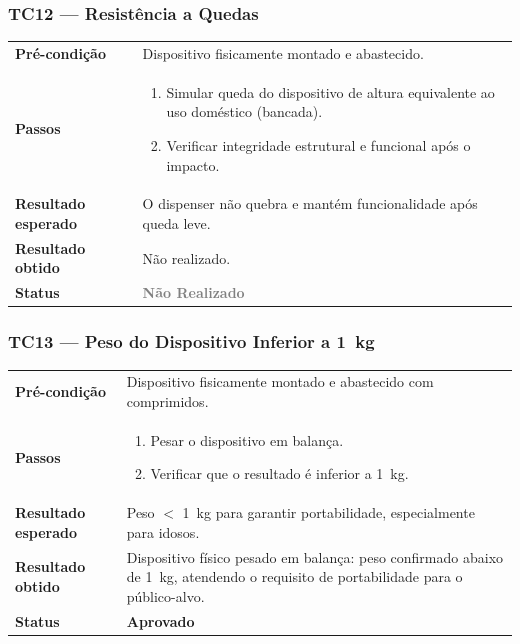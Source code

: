 \documentclass[12pt,a4paper]{article}
\newcommand{\lightrule}{\arrayrulecolor{gray!35}\midrule\arrayrulecolor{black}}
\newcommand{\aprovado}{\textcolor{green!60!black}{\textbf{Aprovado}}}
\newcommand{\naorealizado}{\textcolor{gray}{\textbf{Não Realizado}}}
\begin{document}
\subsubsection{TC12 — Resistência a Quedas}
\begin{table}[H]\small\setlength{\tabcolsep}{6pt}\renewcommand{\arraystretch}{1.3}
\begin{tabularx}{\textwidth}{>{\bfseries}p{4cm} X}
\toprule
Pré-condição & Dispositivo fisicamente montado e abastecido. \\
\lightrule
Passos &
\begin{enumerate}[nosep,leftmargin=*]
  \item Simular queda do dispositivo de altura equivalente ao uso doméstico (bancada).
  \item Verificar integridade estrutural e funcional após o impacto.
\end{enumerate} \\
\lightrule
Resultado esperado & O dispenser não quebra e mantém funcionalidade após queda leve. \\
\lightrule
Resultado obtido & Não realizado. \\
\lightrule
Status & \naorealizado \\
\bottomrule
\end{tabularx}\end{table}

\subsubsection{TC13 — Peso do Dispositivo Inferior a 1~kg}
\begin{table}[H]\small\setlength{\tabcolsep}{6pt}\renewcommand{\arraystretch}{1.3}
\begin{tabularx}{\textwidth}{>{\bfseries}p{4cm} X}
\toprule
Pré-condição & Dispositivo fisicamente montado e abastecido com comprimidos. \\
\lightrule
Passos &
\begin{enumerate}[nosep,leftmargin=*]
  \item Pesar o dispositivo em balança.
  \item Verificar que o resultado é inferior a 1~kg.
\end{enumerate} \\
\lightrule
Resultado esperado & Peso $<$ 1~kg para garantir portabilidade, especialmente para idosos. \\
\lightrule
Resultado obtido & Dispositivo físico pesado em balança: peso confirmado abaixo de 1~kg, atendendo o requisito de portabilidade para o público-alvo. \\
\lightrule
Status & \aprovado \\
\bottomrule
\end{tabularx}\end{table}
\end{document}
